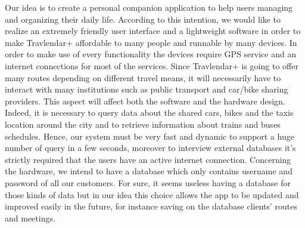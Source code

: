 Our idea is to create a personal companion application to help users managing and organizing their daily life. According to this intention, we would like to realize an extremely friendly user interface and a lightweight software in order to make Travlendar+ affordable to many people and runnable by many devices.
In order to make use of every functionality the devices require GPS service and an internet connections for most of the services.
Since Travlendar+ is going to offer many routes depending on different travel means, it will necessarily have to interact with many institutions such as public transport and car/bike sharing providers. This aspect will affect both the software and the hardware design. Indeed, it is necessary to query data about the shared cars, bikes and the taxis location around the city and to retrieve information about trains and buses schedules. 
Hence, our system must be very fast and dynamic to support a huge number of query in a few seconds, moreover to interview external databases it's strictly required that the users have an active internet connection. 
Concerning the hardware, we intend to have a database which only contains username and password of all our customers. For sure, it seems useless having a database for those kinds of data but in our idea this choice allows the app to be updated and improved easily in the future, for instance saving on the database clients' routes and meetings. 

